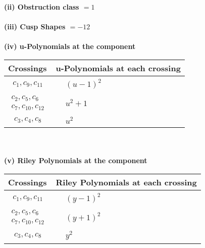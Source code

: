 \documentclass[1p]{elsarticle_modified}
\theoremstyle{definition}
\begin{document}
\flushleft \textbf{(ii) Obstruction class $= 1$}\\~\\
\flushleft \textbf{(iii) Cusp Shapes $= -12$}\\~\\
\newpage\renewcommand{\arraystretch}{1}
\flushleft \textbf{(iv) u-Polynomials at the component}\newline \\
\begin{tabular}{m{50pt}|m{274pt}}
Crossings & \hspace{64pt}u-Polynomials at each crossing \\
\hline $$\begin{aligned}c_{1},c_{9},c_{11}\end{aligned}$$&$\begin{aligned}
&(u-1)^2
\end{aligned}$\\
\hline $$\begin{aligned}c_{2},c_{5},c_{6}\\c_{7},c_{10},c_{12}\end{aligned}$$&$\begin{aligned}
&u^2+1
\end{aligned}$\\
\hline $$\begin{aligned}c_{3},c_{4},c_{8}\end{aligned}$$&$\begin{aligned}
&u^2
\end{aligned}$\\
\hline
\end{tabular}\\~\\
\newpage\renewcommand{\arraystretch}{1}
\flushleft \textbf{(v) Riley Polynomials at the component}\newline \\
\begin{tabular}{m{50pt}|m{274pt}}
Crossings & \hspace{64pt}Riley Polynomials at each crossing \\
\hline $$\begin{aligned}c_{1},c_{9},c_{11}\end{aligned}$$&$\begin{aligned}
&(y-1)^2
\end{aligned}$\\
\hline $$\begin{aligned}c_{2},c_{5},c_{6}\\c_{7},c_{10},c_{12}\end{aligned}$$&$\begin{aligned}
&(y+1)^2
\end{aligned}$\\
\hline $$\begin{aligned}c_{3},c_{4},c_{8}\end{aligned}$$&$\begin{aligned}
&y^2
\end{aligned}$\\
\hline
\end{tabular}\\~\\
\end{document}
